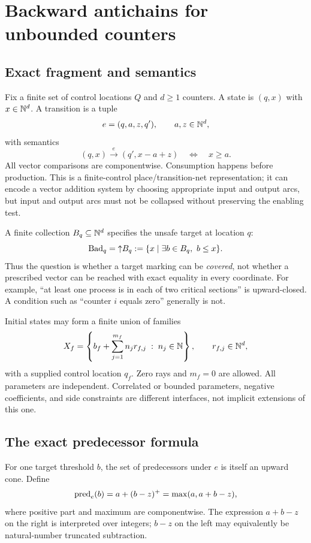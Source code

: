 \section{Backward antichains for unbounded counters}
\label{sec:antichain}

\subsection{Exact fragment and semantics}
Fix a finite set of control locations $Q$ and $d\ge1$ counters. A state is
$(q,x)$ with $x\in\mathbb N^d$. A transition is a tuple
\[
 e=(q,a,z,q'),\qquad a,z\in\mathbb N^d,
\]
with semantics
\begin{equation}
 (q,x)\xrightarrow{e}(q',x-a+z)
 \quad\Longleftrightarrow\quad x\ge a.
 \label{eq:netstep}
\end{equation}
All vector comparisons are componentwise. Consumption happens before
production. This is a finite-control place/transition-net representation; it
can encode a vector addition system by choosing appropriate input and output
arcs, but input and output arcs must not be collapsed without preserving the
enabling test.

A finite collection $B_q\subseteq\mathbb N^d$ specifies the unsafe target at location
$q$:
\[
 \Bad_q=\up{B_q}:=\{x\mid \exists b\in B_q,\ b\le x\}.
\]
Thus the question is whether a target marking can be \emph{covered}, not whether
a prescribed vector can be reached with exact equality in every coordinate.
For example, ``at least one process is in each of two critical sections'' is
upward-closed. A condition such as ``counter $i$ equals zero'' generally is not.

Initial states may form a finite union of families
\begin{equation}
 X_f=\left\{b_f+\sum_{j=1}^{m_f}n_jr_{f,j}\;:\;
                    n_j\in\mathbb N\right\},\qquad r_{f,j}\in\mathbb N^d,
 \label{eq:family}
\end{equation}
with a supplied control location $q_f$. Zero rays and $m_f=0$ are allowed.
All parameters are independent. Correlated or bounded parameters, negative
coefficients, and side constraints are different interfaces, not implicit
extensions of this one.

\subsection{The exact predecessor formula}
For one target threshold $b$, the set of predecessors under $e$ is itself an
upward cone. Define
\begin{equation}
 \operatorname{pred}_e(b)=a+(b-z)^+=\max(a,a+b-z),
 \label{eq:pred}
\end{equation}
where positive part and maximum are componentwise. The expression $a+b-z$ on
the right is interpreted over integers; $b-z$ on the left may equivalently be
natural-number truncated subtraction.

